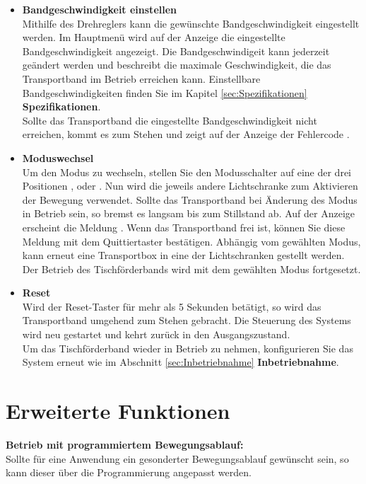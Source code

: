 \begin{itemize}
\begin{itemize}
		Das System setzt sich nach 5 Sekunden Ruhezeit automatisch zurück. Nach Ablauf dieser Ruhezeit kann erneut eine Transportbox zwischen eine der beiden Lichtschranken gelegt werden.
		Wird die Transportbox in dieser Zeit nicht entfernt, so fährt das Transportband diese wieder zurück zum anderen Transportbandendes.\\
		
		Sollte das Objekt die zweite Lichtschranke innerhalb eines festgesetzten Zeitraumes von maximal 30 Sekunden nicht erreichen, hält das Transportband selbstständig an. Auf der Anzeige erscheint der Fehlercode .
		\end{itemize}
	
	\item \textbf{Bandgeschwindigkeit einstellen} \\  
	Mithilfe des Drehreglers kann die gewünschte Bandgeschwindigkeit eingestellt werden.
	Im Hauptmenü wird auf der Anzeige die eingestellte Bandgeschwindigkeit  angezeigt.
	Die Bandgeschwindigeit kann jederzeit geändert werden und beschreibt die maximale Geschwindigkeit, die das Transportband im Betrieb erreichen kann.
	Einstellbare Bandgeschwindigkeiten finden Sie im Kapitel \ref{sec:Spezifikationen} \textbf{Spezifikationen}.\\
	Sollte das Transportband die eingestellte Bandgeschwindigkeit nicht erreichen, kommt es zum Stehen und zeigt auf der Anzeige der Fehlercode .

	\item \textbf{Moduswechsel}\\
	Um den Modus zu wechseln, stellen Sie  den Modusschalter auf eine der drei Positionen ,  oder .
	Nun wird die jeweils andere Lichtschranke zum Aktivieren der Bewegung verwendet.
	Sollte das Transportband bei Änderung des Modus in Betrieb sein, so bremst es langsam bis zum Stillstand ab.
	Auf der Anzeige erscheint die Meldung . Wenn das Transportband frei ist, können Sie diese Meldung mit dem Quittiertaster bestätigen. 
	Abhängig vom gewählten Modus, kann erneut eine Transportbox in eine der Lichtschranken gestellt werden. Der Betrieb des Tischförderbands wird mit dem gewählten Modus fortgesetzt.
	
	\item \textbf{Reset}\\
	Wird der Reset-Taster für mehr als 5 Sekunden betätigt, so wird das Transportband umgehend zum Stehen gebracht. Die Steuerung des Systems wird neu gestartet und kehrt zurück in den Ausgangszustand.\\
	Um das Tischförderband wieder in Betrieb zu nehmen, konfigurieren Sie das System erneut wie im Abschnitt \ref{sec:Inbetriebnahme} \textbf{Inbetriebnahme}.
	
\end{itemize}

\section{Erweiterte Funktionen}	
\textbf{Betrieb mit programmiertem Bewegungsablauf:} \\ 
Sollte für eine Anwendung ein gesonderter Bewegungsablauf gewünscht sein, so kann dieser über die Programmierung angepasst werden. 

